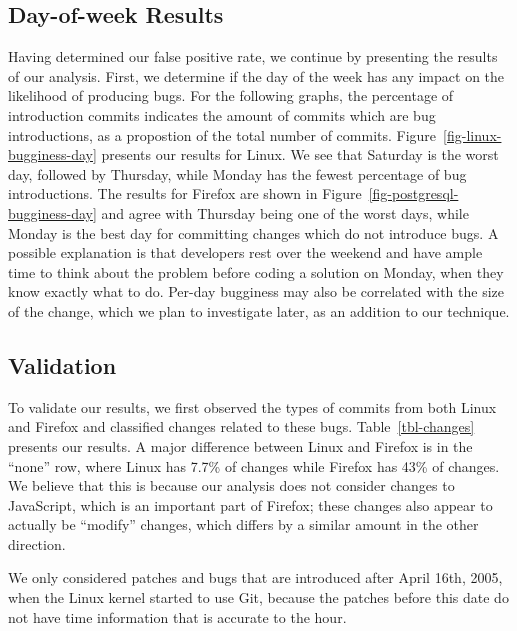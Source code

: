 \subsection{Day-of-week Results} Having determined our false positive rate, 
we continue by presenting the results of our analysis.  First, we
determine if the day of the week has any impact on the likelihood of
producing bugs. For the following graphs, the percentage of
introduction commits indicates the amount of commits which are bug
introductions, as a propostion of the total number of
commits. Figure~\ref{fig-linux-bugginess-day} presents our results for
Linux. We see that Saturday is the worst day, followed by Thursday,
while Monday has the fewest percentage of bug introductions. The
results for Firefox are shown in Figure~\ref{fig-postgresql-bugginess-day} and
agree with Thursday being one of the worst days, while Monday is the
best day for committing changes which do not introduce bugs. A
possible explanation is that developers rest over the weekend and have
ample time to think about the problem before coding a solution on
Monday, when they know exactly what to do. Per-day bugginess may also
be correlated with the size of the change, which we plan to investigate
later, as an addition to our technique.


\subsection{Validation} 
To validate our results, we first observed the types of commits from both Linux
and Firefox and classified changes related to these bugs.
Table~\ref{tbl-changes} presents our results. A major difference
between Linux and Firefox is in the ``none'' row, where Linux has
7.7\% of changes while Firefox has 43\% of changes. We believe that
this is because our analysis does not consider changes to JavaScript,
which is an important part of Firefox; these changes also appear to
actually be ``modify'' changes, which differs by a similar amount
in the other direction.

We only considered patches and bugs that are introduced after April 16th, 2005, when
the Linux kernel started to use Git, because the patches before this date do not have 
time information that is accurate to the hour.




